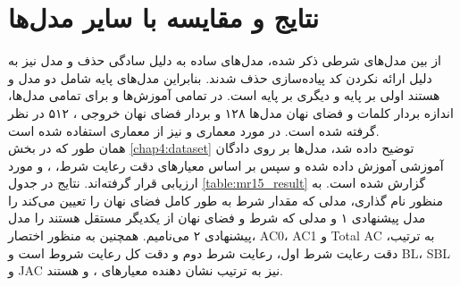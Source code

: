 \section{نتایج و مقایسه با سایر مدل‌ها}
از بین مدل‌های شرطی ذکر شده، مدل‌های ساده به دلیل سادگی حذف و مدل  نیز به دلیل ارائه نکردن کد پیاده‌سازی حذف شدند. بنابراین مدل‌های پایه شامل دو مدل \towardctg{} و \sentigan{} هستند اولی بر پایه \vae{} و دیگری بر پایه \gan{} است. در تمامی آموزش‌ها و برای تمامی مدل‌ها، اندازه بردار \embedding{} کلمات و فضای نهان مدل‌ها ۱۲۸ و بردار فضای نهان خروجی \encoder{}، ۵۱۲ در نظر گرفته شده است. در مورد معماری \encoder{} و \decoder{} نیز از معماری \transformer{} استفاده شده است.
\\
همان طور که در بخش \ref{chap4:dataset} توضیح داده شد، مدل‌ها بر روی دادگان آموزشی  آموزش داده شده و سپس بر اساس معیارهای  دقت رعایت شرط، \bleu{} ، \selfbleu{} و \jaccard{} مورد ارزیابی قرار گرفته‌اند. نتایج در جدول \ref{table:mr15_result} گزارش شده است.
به منظور نام گذاری، مدلی که مقدار شرط به طور کامل فضای نهان را تعیین می‌کند را مدل پیشنهادی ۱ و مدلی که شرط و فضای نهان از یکدیگر مستقل هستند را مدل پیشنهادی ۲ می‌نامیم. همچنین به منظور اختصار، AC0، AC1 و Total AC  به ترتیب، دقت رعایت شرط اول، رعایت شرط دوم و دقت کل رعایت شروط است و BL، SBL و JAC نیز به ترتیب نشان دهنده معیارهای
\bleu{}، \selfbleu{}
و \jaccard{} هستند.
